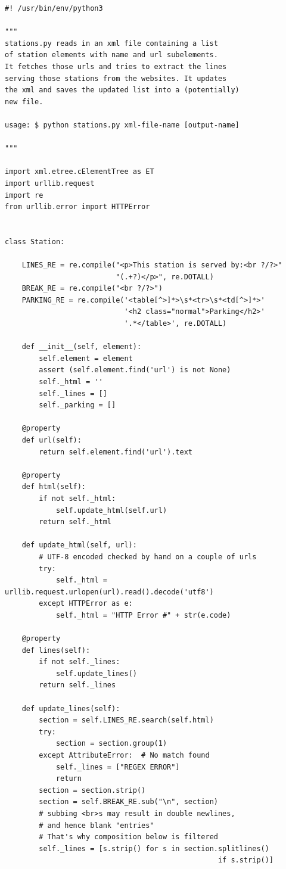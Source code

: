 \documentclass[draft,12pt,titlepage]{article}
\begin{document}
\appendix


\begin{verbatim}
#! /usr/bin/env/python3

"""
stations.py reads in an xml file containing a list
of station elements with name and url subelements.
It fetches those urls and tries to extract the lines
serving those stations from the websites. It updates
the xml and saves the updated list into a (potentially)
new file.

usage: $ python stations.py xml-file-name [output-name]

"""

import xml.etree.cElementTree as ET
import urllib.request
import re
from urllib.error import HTTPError


class Station:

    LINES_RE = re.compile("<p>This station is served by:<br ?/?>"
                          "(.+?)</p>", re.DOTALL)
    BREAK_RE = re.compile("<br ?/?>")
    PARKING_RE = re.compile('<table[^>]*>\s*<tr>\s*<td[^>]*>'
                            '<h2 class="normal">Parking</h2>'
                            '.*</table>', re.DOTALL)

    def __init__(self, element):
        self.element = element
        assert (self.element.find('url') is not None)
        self._html = ''
        self._lines = []
        self._parking = []

    @property
    def url(self):
        return self.element.find('url').text

    @property
    def html(self):
        if not self._html:
            self.update_html(self.url)
        return self._html

    def update_html(self, url):
        # UTF-8 encoded checked by hand on a couple of urls
        try:
            self._html = urllib.request.urlopen(url).read().decode('utf8')
        except HTTPError as e:
            self._html = "HTTP Error #" + str(e.code)

    @property
    def lines(self):
        if not self._lines:
            self.update_lines()
        return self._lines

    def update_lines(self):
        section = self.LINES_RE.search(self.html)
        try:
            section = section.group(1)
        except AttributeError:  # No match found
            self._lines = ["REGEX ERROR"]
            return
        section = section.strip()
        section = self.BREAK_RE.sub("\n", section)
        # subbing <br>s may result in double newlines,
        # and hence blank "entries"
        # That's why composition below is filtered
        self._lines = [s.strip() for s in section.splitlines() 
                                                  if s.strip()]


\end{verbatim}
\end{document}
